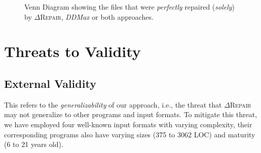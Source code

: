 \documentclass[acmsmall,screen,review,anonymous]{acmart}
\newcounter{todocounter}
\newcommand{\todo}[1]{\marginpar{$|$}\textcolor{red}{\stepcounter{todocounter}\footnote[\thetodocounter]{\textcolor{red}{\textbf{TODO }}\textit{#1}}}}
\renewcommand{\todo}[1]{}
\newcommand{\approach}{\textsc{$\Delta$Repair}\xspace}
\newcommand{\ddmax}{\textit{DDMax}\xspace}
\begin{document}
\begin{figure}[!tbp]\centering
\caption{\centering Venn Diagram showing the 
files that were \textit{perfectly} repaired (\textit{solely}) by \approach,  \ddmax or both approaches. 
}
\centering
\begin{minipage}[b]{0.45\textwidth}
    \centering
\end{minipage}
\vspace{-0.4cm}
\label{fig:perfectlyrepairedvenndiagram}
\end{figure}


\section{Threats to Validity}
\label{sec:threats}


\subsection{External Validity} This refers to the \textit{generalizability} of our approach, i.e., 
the threat that \approach may not generalize to other programs and input formats. 
To mitigate this threat, we have employed four well-known input formats with varying complexity, their corresponding programs also have  varying sizes (375 to 3062 LOC) and maturity (6 to 21 years old). 
\end{document}
